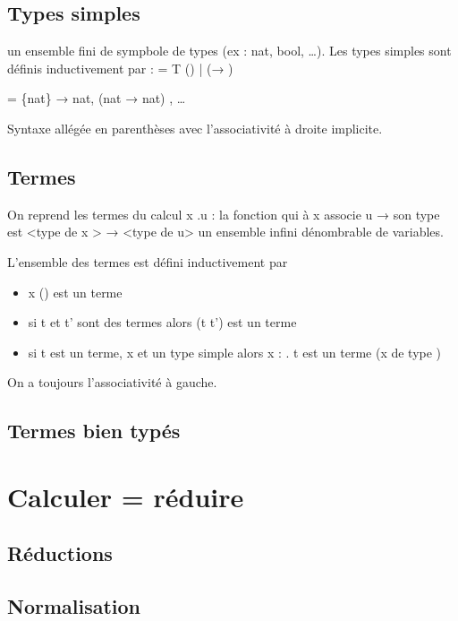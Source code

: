 \documentclass[10pt,a4paper]{article}
\newcommand{\Vs}{\mathbb{V}}
\newcommand{\T}{\mathcal{T}}
\begin{document}
\subsection{Types simples}

\T un ensemble fini de sympbole de types (ex : nat, bool, \dots). Les types simples sont définis inductivement par 
\tau : = T (\in \T) | (\tau → \tau)


\begin{ex}
 \T = \{nat\} → nat, (nat → nat) , \dots
\end{ex}
Syntaxe allégée en parenthèses avec l'associativité à droite implicite.

\subsection{Termes}

On reprend les termes du \lambda calcul
\lambda x .u : la fonction qui à x associe u 
→ son type est <type de x > → <type de u>
\Vs un ensemble infini dénombrable de variables.

\begin{definition}
 L'ensemble des termes est défini inductivement par 
\begin{itemize}
 \item x (\in \Vs) est un terme
 \item si t et t' sont des termes alors (t t') est un terme
 \item si t est un terme, x \in \Vs et \tau un type simple alors 
	\lambda x : \tau . t est un terme (x de type  \tau)
\end{itemize}
On a toujours l'associativité à gauche.
\end{definition}
 

\subsection{Termes bien typés}

\section{Calculer = réduire}

\subsection{Réductions}

\subsection{Normalisation}
\end{document}
